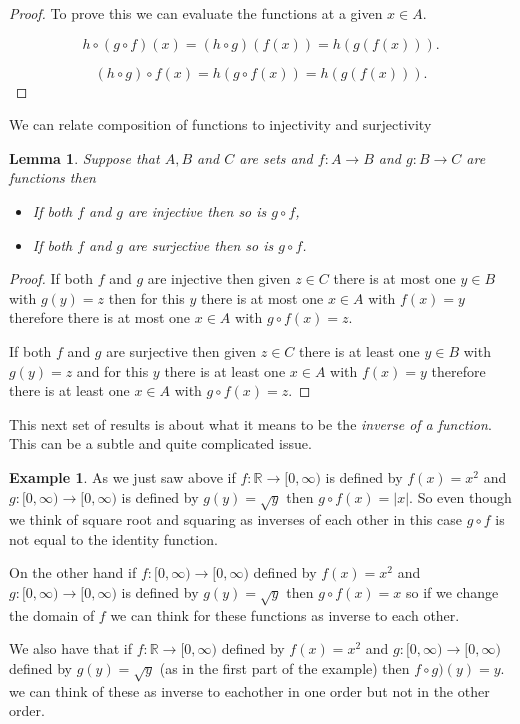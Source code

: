 \documentclass[
]{book}
\newtheorem{lemma}{Lemma}[chapter]
\theoremstyle{definition}
\theoremstyle{definition}
\newtheorem{example}{Example}[chapter]
\theoremstyle{definition}
\theoremstyle{definition}
\theoremstyle{remark}
\begin{document}
\begin{proof}
To prove this we can evaluate the functions at a given \(x \in A\).

\[h \circ (g \circ f)(x) = (h \circ g)(f(x)) = h(g(f(x))).\]

\[(h\circ g) \circ f(x) = h (g\circ f(x)) = h(g(f(x))).\]
\end{proof}

We can relate composition of functions to injectivity and surjectivity

\begin{lemma}

Suppose that \(A, B\) and \(C\) are sets and \(f: A \rightarrow B\) and \(g: B \rightarrow C\) are functions then

\begin{itemize}
\item
  If both \(f\) and \(g\) are injective then so is \(g \circ f\),
\item
  If both \(f\) and \(g\) are surjective then so is \(g \circ f\).
\end{itemize}

\end{lemma}

\begin{proof}
If both \(f\) and \(g\) are injective then given \(z \in C\) there is at most one \(y \in B\) with \(g(y)=z\) then for this \(y\) there is at most one \(x \in A\) with \(f(x) = y\) therefore there is at most one \(x \in A\) with \(g\circ f(x) = z\).

If both \(f\) and \(g\) are surjective then given \(z \in C\) there is at least one \(y \in B\) with \(g(y) = z\) and for this \(y\) there is at least one \(x \in A\) with \(f(x) = y\) therefore there is at least one \(x \in A\) with \(g \circ f (x) = z\).
\end{proof}

This next set of results is about what it means to be the \emph{inverse of a function}. This can be a subtle and quite complicated issue.

\begin{example}
As we just saw above if \(f: \mathbb{R} \rightarrow [0,\infty)\) is defined by \(f(x) = x^2\) and \(g: [0,\infty) \rightarrow [0, \infty)\) is defined by \(g(y) = \sqrt{y}\) then \(g \circ f (x) = |x|\). So even though we think of square root and squaring as inverses of each other in this case \(g \circ f\) is not equal to the identity function.

On the other hand if \(f : [0, \infty) \rightarrow [0, \infty)\) defined by \(f(x)=x^2\) and \(g: [0,\infty) \rightarrow [0,\infty)\) is defined by \(g(y) = \sqrt{y}\) then \(g \circ f(x) = x\) so if we change the domain of \(f\) we can think for these functions as inverse to each other.

We also have that if \(f: \mathbb{R} \rightarrow [0,\infty)\) defined by \(f(x) = x^2\) and \(g: [0, \infty) \rightarrow [0,\infty)\) defined by \(g(y) = \sqrt{y}\) (as in the first part of the example) then \(f\circ g)(y) = y\). we can think of these as inverse to eachother in one order but not in the other order.
\end{example}
\end{document}
